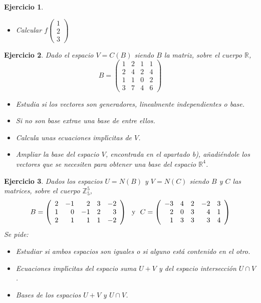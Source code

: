 \documentclass{amsart}
\newtheorem{ejer}{Ejercicio}
\def\r{\mathbb{R}}
\def\z{\mathbb{Z}}
\begin{document}
\begin{ejer}
\begin{itemize}
\item[c)] Calcular $f\left( \begin{array}{r}
1 \\ 2 \\ 3            
\end{array} \right) $

\end{itemize}
\end{ejer}

\begin{ejer} Dado el espacio $V = C(B)$ siendo $B$ la matriz, sobre el cuerpo $\r $, 
\[B = \left( \begin{array}{cccc}
1 & 2 & 1 & 1 \\            
2 & 4 & 2 & 4 \\          
1 & 1 & 0 & 2 \\
3 & 7 & 4 & 6           
\end{array} \right) \]
\begin{itemize}
\item[a)] Estudia si los vectores son generadores, linealmente independientes o base.
\item[b)] Si no son base extrae una base de entre ellos.
\item[c)] Calcula unas ecuaciones impl\'{\i}citas de $V$.
\item[d)] Ampliar la base del espacio $V$, encontrada en el apartado b), a\~nadi\'endole los vectores que se necesiten para obtener una base del espacio $\r ^4$.
\end{itemize}
\end{ejer}

\begin{ejer} Dados los espacios $U = N(B)$ y $V=N(C)$ siendo $B$ y $C$  las matrices, sobre el cuerpo $\z ^5_5 $, 
\[B = \left( \begin{array}{rrrrr}
2 & -1 & 2 & 3 & -2 \\            
1 & 0 & -1 & 2 & 3 \\          
2 & 1 & 1 & 1 & -2           
\end{array} \right) \ \hbox{ y } \ C = \left( \begin{array}{rrrrr}
-3 & 4 & 2 & -2 & 3 \\            
2 & 0 & 3 & 4 & 1 \\          
1 & 3 & 3 & 3 & 4           
\end{array} \right) \] Se pide:
\begin{itemize}
\item[a)] Estudiar si ambos espacios son iguales o si alguno est\'a contenido en el otro.
\item[b)] Ecuaciones impl\'{\i}citas del espacio suma $U+V$ y del espacio intersecci\'on $U\cap V$.
\item[c)] Bases de los espacios $U+V$ y  $U\cap V$.
\end{itemize}
\end{ejer}
\end{document}
